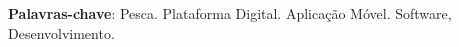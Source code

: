 
\begin{resumo}[RESUMO]
\begin{SingleSpacing}



\hfill \break
\textbf{Palavras-chave}: Pesca. Plataforma Digital. Aplicação Móvel. Software, Desenvolvimento.

\end{SingleSpacing}
\end{resumo}


